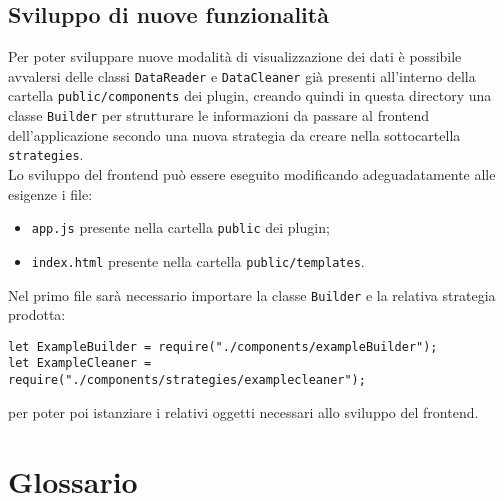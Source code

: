 \subsection{Sviluppo di nuove funzionalità}
\label{sec:nuovefunzionalita}
Per poter sviluppare nuove modalità di visualizzazione dei dati è possibile avvalersi delle classi \texttt{DataReader} e \texttt{DataCleaner} già presenti all'interno della cartella \texttt{public/components} dei plugin, creando quindi in questa directory una classe \texttt{Builder} per strutturare le informazioni da passare al frontend dell'applicazione secondo una nuova strategia da creare nella sottocartella \texttt{strategies}.\\
Lo sviluppo del frontend può essere eseguito modificando adeguadatamente alle esigenze i file:
\begin{itemize}
	\item \texttt{app.js} presente nella cartella \texttt{public} dei plugin;
	\item \texttt{index.html} presente nella cartella \texttt{public/templates}.
\end{itemize}
Nel primo file sarà necessario importare la classe \texttt{Builder} e la relativa strategia prodotta:
\begin{lstlisting}
let ExampleBuilder = require("./components/exampleBuilder");
let ExampleCleaner = require("./components/strategies/examplecleaner");
\end{lstlisting}
per poter poi istanziare i relativi oggetti necessari allo sviluppo del frontend.
\newpage
\appendix
\section{Glossario}







